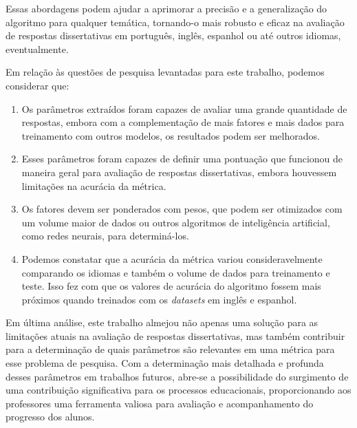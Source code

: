 Essas abordagens podem ajudar a aprimorar a precisão e a generalização do algoritmo para qualquer temática, tornando-o mais robusto e eficaz na avaliação de respostas dissertativas em português, inglês, espanhol ou até outros idiomas, eventualmente.

Em relação às questões de pesquisa levantadas para este trabalho, podemos considerar que:

\begin{enumerate}
    \item Os parâmetros extraídos foram capazes de avaliar uma grande quantidade de respostas, embora com a complementação de mais fatores e mais dados para treinamento com outros modelos, os resultados podem ser melhorados.
    \item Esses parâmetros foram capazes de definir uma pontuação que funcionou de maneira geral para avaliação de respostas dissertativas, embora houvessem limitações na acurácia da métrica.
    \item Os fatores devem ser ponderados com pesos, que podem ser otimizados com um volume maior de dados ou outros algoritmos de inteligência artificial, como redes neurais, para determiná-los.
    \item Podemos constatar que a acurácia da métrica variou consideravelmente comparando os idiomas e também o volume de dados para treinamento e teste. Isso fez com que os valores de acurácia do algoritmo fossem mais próximos quando treinados com os \textit{datasets} em inglês e espanhol.
\end{enumerate}

Em última análise, este trabalho almejou não apenas uma solução para as limitações atuais na avaliação de respostas dissertativas, mas também contribuir para a determinação de quais parâmetros são relevantes em uma métrica para esse problema de pesquisa. Com a determinação mais detalhada e profunda desses parâmetros em trabalhos futuros, abre-se a possibilidade do surgimento de uma contribuição significativa para os processos educacionais, proporcionando aos professores uma ferramenta valiosa para avaliação e acompanhamento do progresso dos alunos.